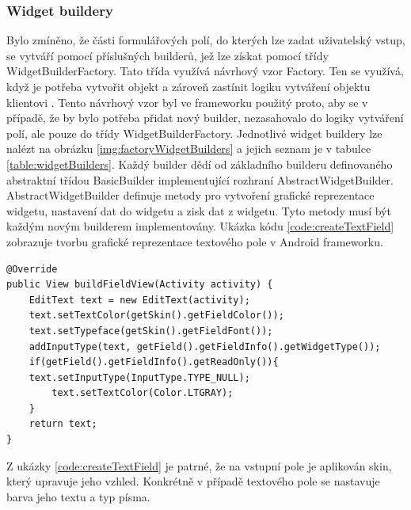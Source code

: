 \subsubsection{Widget buildery}
Bylo zmíněno, že části formulářových polí, do kterých lze zadat uživatelský vstup, se vytváří pomocí příslušných builderů, jež lze získat pomocí třídy WidgetBuilderFactory. Tato třída využívá návrhový vzor Factory. Ten se využívá, když je potřeba vytvořit objekt a zároveň zastínit logiku vytváření objektu klientovi \cite{factorypattern}. Tento návrhový vzor byl ve frameworku použitý proto, aby se v případě, že by bylo potřeba přidat nový builder, nezasahovalo do logiky vytváření polí, ale pouze do třídy WidgetBuilderFactory. Jednotlivé widget buildery lze nalézt na obrázku \ref{img:factoryWidgetBuilders} a jejich seznam je v tabulce \ref{table:widgetBuilders}. Každý builder dědí od základního builderu definovaného abstraktní třídou BasicBuilder implementující rozhraní AbstractWidgetBuilder. AbstractWidgetBuilder definuje metody pro vytvoření grafické reprezentace widgetu, nastavení dat do widgetu a zisk dat z widgetu. Tyto metody musí být každým novým builderem implementovány. Ukázka kódu \ref{code:createTextField} zobrazuje tvorbu grafické reprezentace textového pole v Android frameworku.

\begin{lstlisting}[caption=Ukázka tvorby grafické reprezentace textového pole,
label={code:createTextField}, basicstyle=\footnotesize]
@Override
public View buildFieldView(Activity activity) {
    EditText text = new EditText(activity);
    text.setTextColor(getSkin().getFieldColor());
    text.setTypeface(getSkin().getFieldFont());
    addInputType(text, getField().getFieldInfo().getWidgetType());
    if(getField().getFieldInfo().getReadOnly()){
	text.setInputType(InputType.TYPE_NULL);
        text.setTextColor(Color.LTGRAY);
    }
    return text;
}
\end{lstlisting} 

Z ukázky \ref{code:createTextField} je patrné, že na vstupní pole je aplikován skin, který upravuje jeho vzhled. Konkrétně v případě textového pole se nastavuje barva jeho textu a typ písma.

